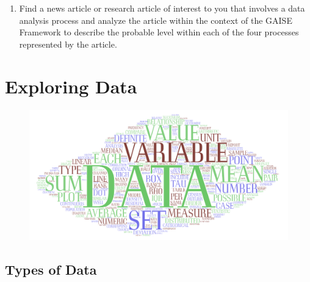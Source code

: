 \documentclass[
]{book}
\providecommand{\tightlist}{%
  \setlength{\itemsep}{0pt}\setlength{\parskip}{0pt}}
\theoremstyle{definition}
\theoremstyle{definition}
\theoremstyle{definition}
\theoremstyle{definition}
\theoremstyle{remark}
\begin{document}
\begin{enumerate}
  \begin{enumerate}
  \def\labelenumii{\alph{enumii}.}
  \tightlist
  \item
    From 2017-2019 the information about fatal police shootings\footnote{\url{https://www.statista.com/statistics/585152/people-shot-to-death-by-us-police-by-race/} retrieved August 1, 2020} indicated that 1,226 white people, 667 black people, and 485 Hispanic people were fatally shot by police. A person concludes that a white person is more likely to be fatally shot by police than a black person.
  \end{enumerate}
\item
  Find a news article or research article of interest to you that involves a data analysis process and analyze the article within the context of the GAISE Framework to describe the probable level within each of the four processes represented by the article.
\end{enumerate}

\hypertarget{ch:data-explore}{%
\chapter{Exploring Data}\label{ch:data-explore}}

\begin{figure}

{\centering \includegraphics[width=0.9\linewidth]{images/DataWordArt} 

}

\end{figure}

\hypertarget{types-of-data}{%
\section{Types of Data}\label{types-of-data}}
\end{document}

